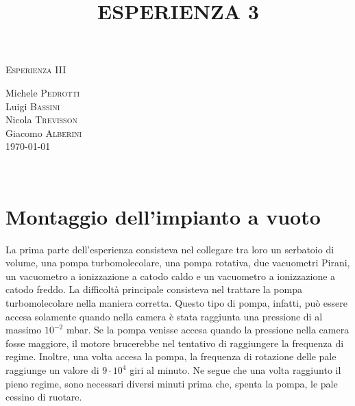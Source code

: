 \documentclass[11pt]{article}
\begin{document}
\begin{center}



\textsc{\Huge Esperienza III}\\[0.5cm]



\large
\title{ESPERIENZA 3}

Michele \textsc{Pedrotti}\\
Luigi \textsc{Bassini}\\
Nicola \textsc{Trevisson}\\
Giacomo \textsc{Alberini}\\
\vspace{1 cm}
\today





\end{center}


~\\
\section{Montaggio dell'impianto a vuoto}
La prima parte dell'esperienza consisteva nel collegare tra loro un serbatoio di volume, una pompa turbomolecolare, una pompa rotativa, due vacuometri Pirani, un vacuometro a ionizzazione a catodo caldo e un vacuometro a ionizzazione a catodo freddo. 
La difficoltà principale consisteva nel trattare la pompa turbomolecolare nella maniera corretta. Questo tipo di pompa, infatti, può essere accesa solamente quando nella camera è stata raggiunta una pressione di al massimo $10^{-2}$ mbar.
Se la pompa venisse accesa quando la pressione nella camera fosse maggiore, il motore brucerebbe nel tentativo di raggiungere la frequenza di regime. Inoltre, una volta accesa la pompa, la frequenza di rotazione delle pale raggiunge un valore di $9\cdot10^{4}$ giri al minuto. Ne segue che una volta raggiunto il pieno regime, sono necessari diversi minuti prima che, spenta la pompa, le pale cessino di ruotare. 
\end{document}
